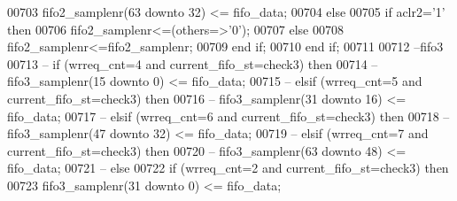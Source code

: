 \begin{DoxyCode}
00703             \textcolor{vhdlchar}{fifo2_samplenr}\textcolor{vhdlchar}{(}\textcolor{vhdllogic}{}\textcolor{vhdllogic}{63} \textcolor{keywordflow}{downto} \textcolor{vhdllogic}{}\textcolor{vhdllogic}{32}\textcolor{vhdlchar}{)} \textcolor{vhdlchar}{<=} \textcolor{vhdlchar}{fifo_data}; 
00704           \textcolor{keywordflow}{else}
00705             \textcolor{keywordflow}{if} \textcolor{vhdlchar}{aclr2}\textcolor{vhdlchar}{=}\textcolor{vhdlchar}{'}\textcolor{vhdllogic}{}\textcolor{vhdllogic}{1}\textcolor{vhdlchar}{'} \textcolor{keywordflow}{then} 
00706               \textcolor{vhdlchar}{fifo2_samplenr}\textcolor{vhdlchar}{<=}\textcolor{vhdlchar}{(}\textcolor{keywordflow}{others}\textcolor{vhdlchar}{=}\textcolor{vhdlchar}{>}\textcolor{vhdlchar}{'}\textcolor{vhdllogic}{}\textcolor{vhdllogic}{0}\textcolor{vhdlchar}{'}\textcolor{vhdlchar}{)};
00707             \textcolor{keywordflow}{else}  
00708               \textcolor{vhdlchar}{fifo2_samplenr}\textcolor{vhdlchar}{<=}\textcolor{vhdlchar}{fifo2_samplenr};
00709             \textcolor{keywordflow}{end} \textcolor{keywordflow}{if};
00710           \textcolor{keywordflow}{end} \textcolor{keywordflow}{if};
00711             
00712 \textcolor{keyword}{          --fifo3                       }
00713 \textcolor{keyword}{--        if (wrreq\_cnt=4 and current\_fifo\_st=check3) then }
00714 \textcolor{keyword}{--          fifo3\_samplenr(15 downto 0) <= fifo\_data;}
00715 \textcolor{keyword}{--        elsif (wrreq\_cnt=5 and current\_fifo\_st=check3) then}
00716 \textcolor{keyword}{--          fifo3\_samplenr(31 downto 16) <= fifo\_data;}
00717 \textcolor{keyword}{--        elsif (wrreq\_cnt=6 and current\_fifo\_st=check3) then}
00718 \textcolor{keyword}{--          fifo3\_samplenr(47 downto 32) <= fifo\_data; }
00719 \textcolor{keyword}{--        elsif (wrreq\_cnt=7 and current\_fifo\_st=check3) then}
00720 \textcolor{keyword}{--          fifo3\_samplenr(63 downto 48) <= fifo\_data; }
00721 \textcolor{keyword}{--        else}
00722           \textcolor{keywordflow}{if} \textcolor{vhdlchar}{(}\textcolor{vhdlchar}{wrreq_cnt}\textcolor{vhdlchar}{=}\textcolor{vhdllogic}{}\textcolor{vhdllogic}{2} \textcolor{keywordflow}{and} \textcolor{vhdlchar}{current_fifo_st}\textcolor{vhdlchar}{=}\textcolor{vhdlchar}{check3}\textcolor{vhdlchar}{)} \textcolor{keywordflow}{then} 
00723             \textcolor{vhdlchar}{fifo3_samplenr}\textcolor{vhdlchar}{(}\textcolor{vhdllogic}{}\textcolor{vhdllogic}{31} \textcolor{keywordflow}{downto} \textcolor{vhdllogic}{}\textcolor{vhdllogic}{0}\textcolor{vhdlchar}{)} \textcolor{vhdlchar}{<=} \textcolor{vhdlchar}{fifo_data};

\end{DoxyCode}
